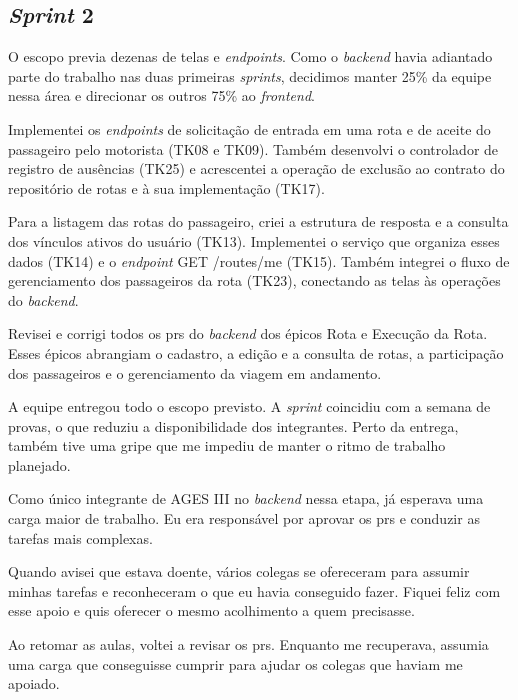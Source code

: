 \subsection{\textit{Sprint} 2}

O escopo previa dezenas de telas e \textit{endpoints}. Como o
\textit{backend} havia adiantado parte do trabalho nas duas primeiras
\textit{sprints}, decidimos manter 25\% da equipe nessa área e direcionar os
outros 75\% ao \textit{frontend}.

Implementei os \textit{endpoints} de solicitação de entrada em uma rota e de
aceite do passageiro pelo motorista (TK08 e TK09). Também desenvolvi o
controlador de registro de ausências (TK25) e acrescentei a operação de exclusão
ao contrato do repositório de rotas e à sua implementação (TK17).

Para a listagem das rotas do passageiro, criei a estrutura de resposta e a
consulta dos vínculos ativos do usuário (TK13). Implementei o serviço que
organiza esses dados (TK14) e o \textit{endpoint} GET /routes/me (TK15).
Também integrei o fluxo de gerenciamento dos passageiros da rota (TK23),
conectando as telas às operações do \textit{backend}.

Revisei e corrigi todos os \acp{pr} do \textit{backend} dos épicos Rota e
Execução da Rota. Esses épicos abrangiam o cadastro, a edição e a consulta de
rotas, a participação dos passageiros e o gerenciamento da viagem em andamento.

A equipe entregou todo o escopo previsto. A \textit{sprint} coincidiu com a
semana de provas, o que reduziu a
disponibilidade dos integrantes. Perto da entrega, também tive uma gripe que
me impediu de manter o ritmo de trabalho planejado.

Como único integrante de AGES III no \textit{backend} nessa etapa, já
esperava uma carga maior de trabalho. Eu era responsável por aprovar os
\acp{pr} e conduzir as tarefas mais complexas.

Quando avisei que estava doente, vários colegas se ofereceram para assumir
minhas tarefas e reconheceram o que eu havia conseguido fazer. Fiquei feliz
com esse apoio e quis oferecer o mesmo acolhimento a quem precisasse.

Ao retomar as aulas, voltei a revisar os \acp{pr}. Enquanto me recuperava,
assumia uma carga que conseguisse cumprir para ajudar os colegas que haviam
me apoiado.
